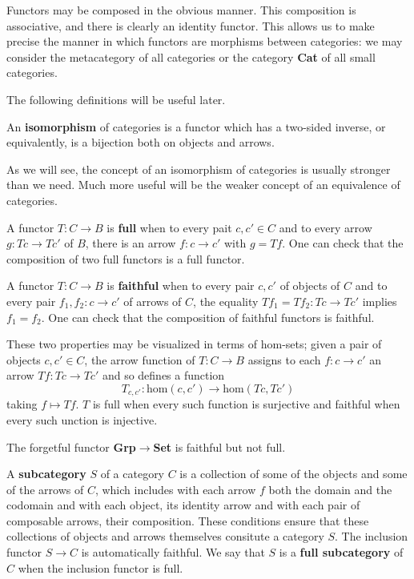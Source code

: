 \documentclass{../../mathnotes}
\begin{document}
\begin{rem}
    Functors may be composed in the obvious manner. This composition is associative, and there is clearly an
    identity functor. This allows us to make precise the manner in which functors are morphisms between categories:
    we may consider the metacategory of all categories or the category \textbf{Cat} of all small categories.
\end{rem}

The following definitions will be useful later.

\begin{defn}
    An \textbf{isomorphism} of categories is a functor which has a two-sided inverse, or equivalently,
    is a bijection both on objects and arrows.
\end{defn}

\begin{rem}
    As we will see, the concept of an isomorphism of categories is usually stronger than we need.
    Much more useful will be the weaker concept of an equivalence of categories.
\end{rem}

\begin{defn}
    A functor $T:C\to B$ is \textbf{full} when to every pait $c,c'\in C$ and to every arrow $g:Tc\to Tc'$ of $B$,
    there is an arrow $f:c\to c'$ with $g=Tf$. One can check that the composition of two full functors is a full functor.
    
    A functor $T:C\to B$ is \textbf{faithful} when to every pair $c,c'$ of objects of $C$ and to every pair $f_1,f_2:c\to c'$
    of arrows of $C$, the equality $Tf_1=Tf_2:Tc\to Tc'$ implies $f_1=f_2$. One can check that the composition of
    faithful functors is faithful.
\end{defn}

These two properties may be visualized in terms of hom-sets; given a pair of objects $c,c'\in C$, the arrow function
of $T:C\to B$ assigns to each $f:c\to c'$ an arrow $Tf:Tc\to Tc'$ and so defines a function
\[T_{c,c'}:\text{hom}(c,c')\to\text{hom}(Tc,Tc')\]
taking $f\mapsto Tf$. $T$ is full when every such function is surjective and faithful when every such unction is injective.

\begin{exmp}
    The forgetful functor \textbf{Grp}$\to$\textbf{Set} is faithful but not full.
\end{exmp}

\begin{defn}
    A \textbf{subcategory} $S$ of a category $C$ is a collection of some of the objects and some of the arrows of
    $C$, which includes with each arrow $f$ both the domain and the codomain and with each object, its identity arrow
    and with each pair of composable arrows, their composition. These conditions ensure that these collections of
    objects and arrows themselves consitute a category $S$. The inclusion functor $S\to C$ is automatically
    faithful. We say that $S$ is a \textbf{full subcategory} of $C$ when the inclusion functor is full.
\end{defn}
\end{document}
